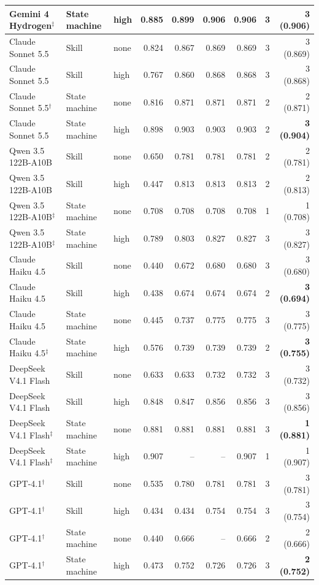 {\begin{longtable}{@{}l l l r r r r c r@{}}
Gemini 4 Hydrogen$^{\ddagger}$ & State machine & high & 0.885 & 0.899 & 0.906 & 0.906 & 3 & 3 (0.906)\\
\midrule
Claude Sonnet 5.5 & Skill & none & 0.824 & 0.867 & 0.869 & 0.869 & 3 & 3 (0.869)\\
Claude Sonnet 5.5 & Skill & high & 0.767 & 0.860 & 0.868 & 0.868 & 3 & 3 (0.868)\\
Claude Sonnet 5.5$^{\dagger}$ & State machine & none & 0.816 & 0.871 & 0.871 & 0.871 & 2 & 2 (0.871)\\
Claude Sonnet 5.5 & State machine & high & 0.898 & 0.903 & 0.903 & 0.903 & 2 & \textbf{3 (0.904)}\\
\midrule
Qwen 3.5 122B-A10B & Skill & none & 0.650 & 0.781 & 0.781 & 0.781 & 2 & 2 (0.781)\\
Qwen 3.5 122B-A10B & Skill & high & 0.447 & 0.813 & 0.813 & 0.813 & 2 & 2 (0.813)\\
Qwen 3.5 122B-A10B$^{\ddagger}$ & State machine & none & 0.708 & 0.708 & 0.708 & 0.708 & 1 & 1 (0.708)\\
Qwen 3.5 122B-A10B$^{\ddagger}$ & State machine & high & 0.789 & 0.803 & 0.827 & 0.827 & 3 & 3 (0.827)\\
\midrule
Claude Haiku 4.5 & Skill & none & 0.440 & 0.672 & 0.680 & 0.680 & 3 & 3 (0.680)\\
Claude Haiku 4.5 & Skill & high & 0.438 & 0.674 & 0.674 & 0.674 & 2 & \textbf{3 (0.694)}\\
Claude Haiku 4.5 & State machine & none & 0.445 & 0.737 & 0.775 & 0.775 & 3 & 3 (0.775)\\
Claude Haiku 4.5$^{\ddagger}$ & State machine & high & 0.576 & 0.739 & 0.739 & 0.739 & 2 & \textbf{3 (0.755)}\\
\midrule
DeepSeek V4.1 Flash & Skill & none & 0.633 & 0.633 & 0.732 & 0.732 & 3 & 3 (0.732)\\
DeepSeek V4.1 Flash & Skill & high & 0.848 & 0.847 & 0.856 & 0.856 & 3 & 3 (0.856)\\
DeepSeek V4.1 Flash$^{\ddagger}$ & State machine & none & 0.881 & 0.881 & 0.881 & 0.881 & 3 & \textbf{1 (0.881)}\\
DeepSeek V4.1 Flash$^{\ddagger}$ & State machine & high & 0.907 & -- & -- & 0.907 & 1 & 1 (0.907)\\
\midrule
GPT-4.1$^{\dagger}$ & Skill & none & 0.535 & 0.780 & 0.781 & 0.781 & 3 & 3 (0.781)\\
GPT-4.1$^{\dagger}$ & Skill & high & 0.434 & 0.434 & 0.754 & 0.754 & 3 & 3 (0.754)\\
GPT-4.1$^{\dagger}$ & State machine & none & 0.440 & 0.666 & -- & 0.666 & 2 & 2 (0.666)\\
GPT-4.1$^{\dagger}$ & State machine & high & 0.473 & 0.752 & 0.726 & 0.726 & 3 & \textbf{2 (0.752)}\\
\bottomrule\end{longtable}}
